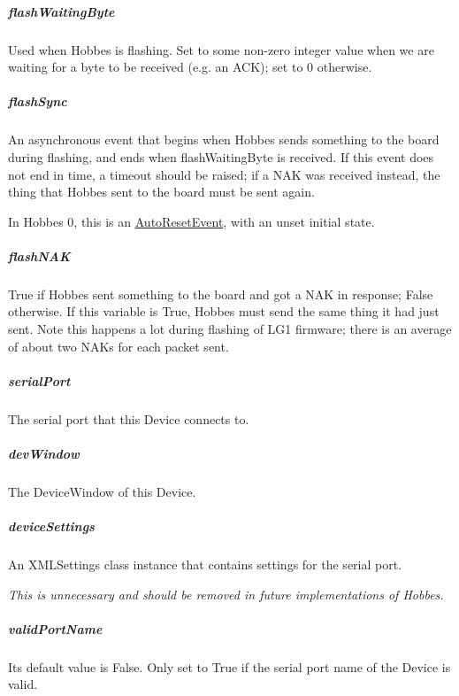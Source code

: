 \documentclass[12pt,letterpaper]{article}
\begin{document}
%
%
\subparagraph{flashWaitingByte}
\label{4.3.2.2.9}

Used when Hobbes is flashing. Set to some non-zero integer value when we are waiting for a byte to be received (e.g. an ACK); set to 0 otherwise.



%
%
\subparagraph{flashSync}
\label{4.3.2.2.10}

An asynchronous event that begins when Hobbes sends something to the board during flashing, and ends when flashWaitingByte is received. If this event does not end in time, a timeout should be raised; if a NAK was received instead, the thing that Hobbes sent to the board must be sent again.

In Hobbes 0, this is an \href{http://msdn.microsoft.com/en-us/library/system.threading.autoresetevent.aspx}{AutoResetEvent}, with an unset initial state.



%
%
\subparagraph{flashNAK}
\label{4.3.2.2.11}

True if Hobbes sent something to the board and got a NAK in response; False otherwise. If this variable is True, Hobbes must send the same thing it had just sent. Note this happens a lot during flashing of LG1 firmware; there is an average of about two NAKs for each packet sent.



%
%
\subparagraph{serialPort}
\label{4.3.2.2.12}

The serial port that this Device connects to.



%
%
\subparagraph{devWindow}
\label{4.3.2.2.13}

The DeviceWindow of this Device.



%
%
\subparagraph{deviceSettings}
\label{4.3.2.2.14}

An XMLSettings class instance that contains settings for the serial port.

\emph{This is unnecessary and should be removed in future implementations of Hobbes.}



%
%
\subparagraph{validPortName}
\label{4.3.2.2.15}

Its default value is False. Only set to True if the serial port name of the Device is valid.
\end{document}
